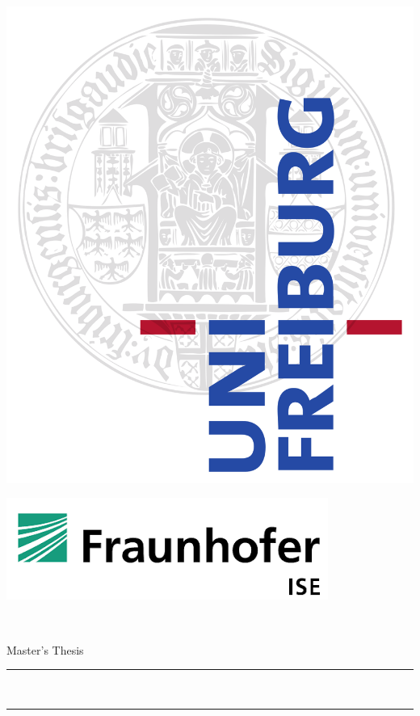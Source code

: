 
\begin{titlepage}
\begin{center}
	\begin{minipage}{.5\textwidth}
	\centering
	\includegraphics[width=.5\linewidth]{uni_logo.png}
\end{minipage}%
\begin{minipage}{.5\textwidth}
	\centering
	\includegraphics[width=.9\linewidth]{Fraunhofer_logo.png}
\end{minipage} \\[1cm]

\newcommand{\HorizontalLine}{\rule{\linewidth}{0.3mm}}

{\Large Master's Thesis}\\[0.8cm]


\HorizontalLine \\[0.4cm]
{ \huge \bfseries \thetitle }
\HorizontalLine \\[1.2cm]



\end{center}
\end{titlepage}
